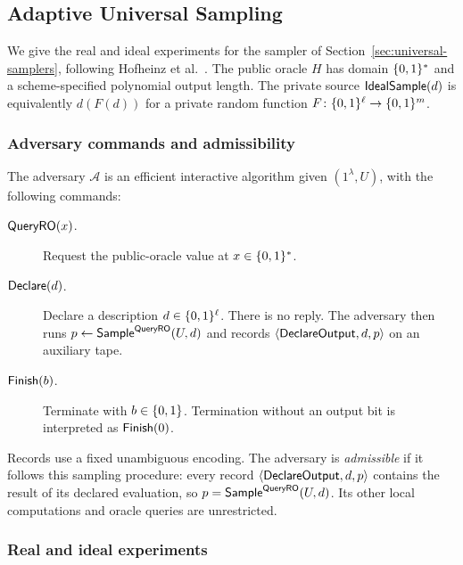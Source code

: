 \subsection{Adaptive Universal Sampling}
\label{app:universal-samplers}

We give the real and ideal experiments for the sampler of
Section~\ref{sec:universal-samplers}, following Hofheinz et al.\
\cite[full version, Section~3.2, Definition~4]{HofheinzEtAl2016UniversalSamplers}.
The public oracle $H$ has domain $\{0,1\}^*$ and a scheme-specified
polynomial output length.  The private source $\mathsf{IdealSample}(d)$ is
equivalently $d(F(d))$ for a private random function
$F\colon\{0,1\}^\ell\to\{0,1\}^m$.

\subsubsection{Adversary commands and admissibility}
\label{sec:sampler-commands}

The adversary $\mathcal A$ is an efficient interactive algorithm given
$(1^\lambda,U)$, with the following commands:
\begin{description}
  \item[$\mathsf{QueryRO}(x)$.]
    Request the public-oracle value at $x\in\{0,1\}^*$.
  \item[$\mathsf{Declare}(d)$.]
    Declare a description $d\in\{0,1\}^\ell$.  There is no reply.
    The adversary then runs $p\gets\mathsf{Sample}^{\mathsf{QueryRO}}(U,d)$ and
    records $\langle\mathsf{DeclareOutput},d,p\rangle$ on an auxiliary tape.
  \item[$\mathsf{Finish}(b)$.]
    Terminate with $b\in\{0,1\}$.  Termination without an output bit is
    interpreted as $\mathsf{Finish}(0)$.
\end{description}
Records use a fixed unambiguous encoding.  The adversary is
\emph{admissible} if it follows this sampling procedure: every record
$\langle\mathsf{DeclareOutput},d,p\rangle$ contains the result of its declared
evaluation, so $p=\mathsf{Sample}^{\mathsf{QueryRO}}(U,d)$.  Its other local computations
and oracle queries are unrestricted.

\subsubsection{Real and ideal experiments}
\label{sec:sampler-experiments}

